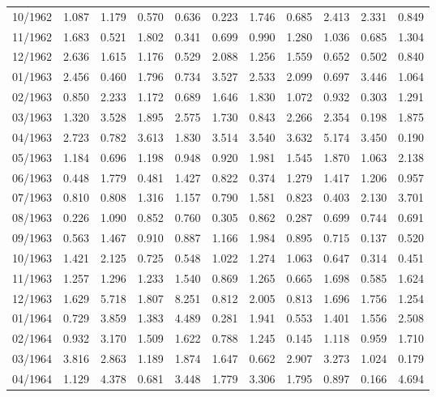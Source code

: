 \begin{tabular}{lrrrrrrrrrr}
10/1962 &  1.087 &  1.179 &  0.570 &  0.636 &  0.223 &  1.746 &  0.685 &  2.413 &  2.331 &  0.849 \\
11/1962 &  1.683 &  0.521 &  1.802 &  0.341 &  0.699 &  0.990 &  1.280 &  1.036 &  0.685 &  1.304 \\
12/1962 &  2.636 &  1.615 &  1.176 &  0.529 &  2.088 &  1.256 &  1.559 &  0.652 &  0.502 &  0.840 \\
01/1963 &  2.456 &  0.460 &  1.796 &  0.734 &  3.527 &  2.533 &  2.099 &  0.697 &  3.446 &  1.064 \\
02/1963 &  0.850 &  2.233 &  1.172 &  0.689 &  1.646 &  1.830 &  1.072 &  0.932 &  0.303 &  1.291 \\
03/1963 &  1.320 &  3.528 &  1.895 &  2.575 &  1.730 &  0.843 &  2.266 &  2.354 &  0.198 &  1.875 \\
04/1963 &  2.723 &  0.782 &  3.613 &  1.830 &  3.514 &  3.540 &  3.632 &  5.174 &  3.450 &  0.190 \\
05/1963 &  1.184 &  0.696 &  1.198 &  0.948 &  0.920 &  1.981 &  1.545 &  1.870 &  1.063 &  2.138 \\
06/1963 &  0.448 &  1.779 &  0.481 &  1.427 &  0.822 &  0.374 &  1.279 &  1.417 &  1.206 &  0.957 \\
07/1963 &  0.810 &  0.808 &  1.316 &  1.157 &  0.790 &  1.581 &  0.823 &  0.403 &  2.130 &  3.701 \\
08/1963 &  0.226 &  1.090 &  0.852 &  0.760 &  0.305 &  0.862 &  0.287 &  0.699 &  0.744 &  0.691 \\
09/1963 &  0.563 &  1.467 &  0.910 &  0.887 &  1.166 &  1.984 &  0.895 &  0.715 &  0.137 &  0.520 \\
10/1963 &  1.421 &  2.125 &  0.725 &  0.548 &  1.022 &  1.274 &  1.063 &  0.647 &  0.314 &  0.451 \\
11/1963 &  1.257 &  1.296 &  1.233 &  1.540 &  0.869 &  1.265 &  0.665 &  1.698 &  0.585 &  1.624 \\
12/1963 &  1.629 &  5.718 &  1.807 &  8.251 &  0.812 &  2.005 &  0.813 &  1.696 &  1.756 &  1.254 \\
01/1964 &  0.729 &  3.859 &  1.383 &  4.489 &  0.281 &  1.941 &  0.553 &  1.401 &  1.556 &  2.508 \\
02/1964 &  0.932 &  3.170 &  1.509 &  1.622 &  0.788 &  1.245 &  0.145 &  1.118 &  0.959 &  1.710 \\
03/1964 &  3.816 &  2.863 &  1.189 &  1.874 &  1.647 &  0.662 &  2.907 &  3.273 &  1.024 &  0.179 \\
04/1964 &  1.129 &  4.378 &  0.681 &  3.448 &  1.779 &  3.306 &  1.795 &  0.897 &  0.166 &  4.694 \\

\end{tabular}
